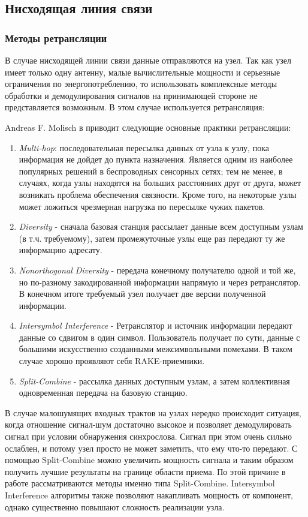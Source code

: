 \documentclass[a4paper,12pt,oneside]{scrartcl}
\begin{document}
\subsection{Нисходящая линия связи}
\subsubsection{Методы ретрансляции}
В случае нисходящей линии связи данные отправляются на узел. 
Так как узел имеет только одну антенну, малые вычислительные мощности и серьезные ограничения по энергопотреблению, то использовать комплексные методы обработки и демодулирования сигналов на принимающей стороне не представляется возможным. 
В этом случае используется ретрансляция:

Andreas F. Molisch в \cite{B1} приводит следующие основные практики ретрансляции:
\begin{enumerate}
\item \textit{Multi-hop}: последовательная пересылка данных от узла к узлу, пока информация не дойдет до пункта назначения. 
Является одним из наиболее популярных решений в беспроводных сенсорных сетях; тем не менее, в случаях, когда узлы находятся на больших расстояниях друг от друга, может возникать проблема обеспечения связности. 
Кроме того, на некоторые узлы может ложиться чрезмерная нагрузка по пересылке чужих пакетов.
\item \textit{Diversity} - сначала базовая станция рассылает данные всем доступным узлам (в т.ч. требуемому), затем  промежуточные узлы еще раз передают ту же информацию адресату.
\item \textit{Nonorthogonal Diversity} - передача конечному получателю одной и той же, но по-разному закодированной информации напрямую и через ретранслятор. 
В конечном итоге требуемый узел получает две версии полученной информации.
\item \textit{Intersymbol Interference} - Ретранслятор и источник информации передают данные со сдвигом в один символ. 
Пользователь получает по сути, данные с большими искусственно созданными межсимвольными помехами. В таком случае хорошо проявляют себя RAKE-приемники. \cite{A7}
\item \textit{Split-Combine} - рассылка данных доступным узлам, а затем коллективная одновременная передача на базовую станцию.
\end{enumerate}

В случае малошумящих входных трактов на узлах нередко происходит ситуация, когда отношение сигнал-шум достаточно высокое и позволяет демодулировать сигнал при условии обнаружения синхрослова. 
Сигнал при этом очень сильно ослаблен, и потому узел просто не может заметить, что ему что-то передают. 
С помощью Split-Combine можно увеличить мощность сигнала и таким образом получить лучшие результаты на границе области приема. 
По этой причине в работе рассматриваются методы именно типа Split-Combine. 
Intersymbol Interference алгоритмы также позволяют накапливать мощность от компонент, однако существенно повышают сложность реализации узла.
\end{document}

